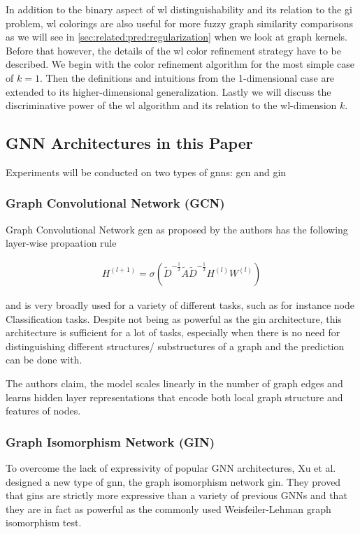 In addition to the binary aspect of \ac{wl} distinguishability and its relation to the \ac{gi} problem, \ac{wl} colorings are also useful for more fuzzy graph similarity comparisons as we will see in \cref{sec:related:pred:regularization} when we look at graph kernels.
Before that however, the details of the \ac{wl} color refinement strategy have to be described.
We begin with the color refinement algorithm for the most simple case of $k = 1$.
Then the definitions and intuitions from the 1-dimensional case are extended to its higher-dimensional generalization.
Lastly we will discuss the discriminative power of the \acs{wl} algorithm and its relation to the \acs{wl}-dimension $k$.


\subsection{GNN Architectures in this Paper}
\label{sec:related:architectures}

Experiments will be conducted on two types of \acp{gnn}: \ac{gcn} and \ac{gin}



\subsubsection{Graph Convolutional Network (GCN)}
\label{sec:related:architectures:gcn}
Graph Convolutional Network \ac{gcn} as proposed by the authors \cite{Kipf2017} has the
following layer-wise propaation rule

\begin{align*}
    H^{(l+1)} = \sigma (\tilde{D}^{-\frac{1}{2}}\tilde{A}\tilde{D}^{-\frac{1}{2}} H^{(l)}W^{(l)})
\end{align*}


and is very broadly used for a variety of different tasks, such as for instance node Classification tasks.
Despite not being as powerful as the \ac{gin} architecture, this architecture is sufficient for a lot
of tasks, especially when there is no need for distinguishing different structures/ substructures
of a graph and the prediction can be done with.

The authors claim, the model scales linearly in the number of graph edges and learns hidden layer
representations that encode both local graph structure and features of nodes.

\subsubsection{Graph Isomorphism Network (GIN)}
\label{sec:related:architectures:gin}
To overcome the lack of expressivity of popular GNN architectures,
Xu et al. designed a new type of \ac{gnn}, the graph isomorphism network \ac{gin}. They proved that
\acp{gin} are strictly more expressive than a variety of previous GNNs and that they are in fact
as powerful as the commonly used Weisfeiler-Lehman graph isomorphism test.

